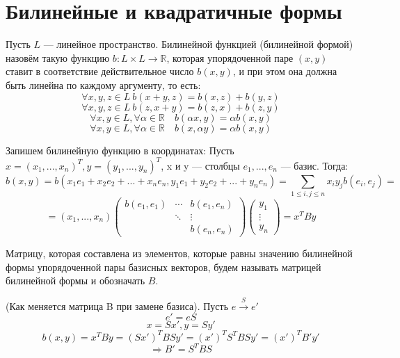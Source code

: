 \documentclass[11pt]{article}
\begin{document}
\section{Билинейные и квадратичные формы}

\begin{definition}
    Пусть $L$ --- линейное пространство. Билинейной функцией (билинейной формой) назовём такую функцию $b \colon L \times L \to \mathbb{R}$, которая упорядоченной паре $(x,y)$ ставит в соответствие действительное число $b(x, y)$,
    и при этом она должна быть линейна по каждому аргументу, то есть:
    \[ \forall x,y,z \in L \ b(x+y,z)= b(x,z)+b(y,z) \]
    \[ \forall x,y,z \in L \ b(z,x+y) = b(z,x) + b(z,y) \]
    \[ \forall x,y\in L, \forall \alpha\in \mathbb{R} \quad  b(\alpha x,y) = \alpha b(x,y) \]
    \[ \forall x,y\in L, \forall \alpha\in \mathbb{R} \quad  b(x,\alpha y) = \alpha b(x,y) \]

\end{definition}

\begin{definition}
    Запишем билинейную функцию в координатах:
    Пусть $x=(x_1,...,x_n)^T, y=(y_1,...,y_n)^T$, x и y --- столбцы $e_1,...,e_n$ --- базис. Тогда:
    \[ b(x,y) = b(x_1e_1+x_2e_2+...+x_ne_n, y_1e_1+y_2e_2+...+y_ne_n) =  \sum_{1\le i, j\le n} x_i y_j b(e_i,e_j) =\]
    \[ =(x_1,...,x_n)\begin{pmatrix}
        b(e_1,e_1) & \cdots & b(e_1,e_n) \\
        & \ddots & \vdots \\
        &        & b(e_n,e_n)
    \end{pmatrix}  
    \begin{pmatrix}
        y_1\\
        \vdots\\
        y_n
    \end{pmatrix}
    = x^T By \]
\end{definition}

\begin{definition}
    Матрицу, которая составлена из элементов, которые равны значению билинейной формы упорядоченной пары базисных векторов, будем называть матрицей билинейной формы и обозначать $B$.
\end{definition}

\begin{remark}
    (Как меняется матрица B при замене базиса). Пусть $e\xrightarrow{S} e'$ 
    \[ e'=eS\]
    \[ x= Sx', y=Sy' \]
    \[ b(x,y) = x^T By = (Sx')^T B Sy'= (x')^T S^T BSy' = (x')^T B'y' \]
    \[ \Rightarrow B' = S^T BS \]
\end{remark}
\end{document}
